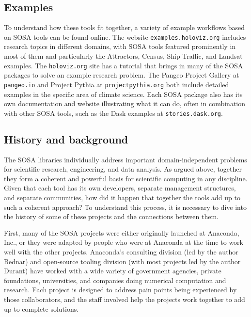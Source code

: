 \subsection{Examples}

To understand how these tools fit together, a variety of example workflows based on SOSA tools can be found online. The website \texttt{examples.holoviz.org} includes research topics in different domains, with SOSA tools featured prominently in most of them and particularly the Attractors, Census, Ship Traffic, and Landsat examples. The \texttt{holoviz.org} site has a tutorial that brings in many of the SOSA packages to solve an example research problem. The Pangeo Project Gallery at \texttt{pangeo.io} and Project Pythia at \texttt{projectpythia.org} both include detailed examples in the specific area of climate science. Each SOSA package also has its own documentation and website illustrating what it can do, often in combination with other SOSA tools, such as the Dask examples at \texttt{stories.dask.org}.

\subsection{History and background}

The SOSA libraries individually address important domain-independent problems for scientific research, engineering, and data analysis. As argued above, together they form a coherent and powerful basis for scientific computing in any discipline. Given that each tool has its own developers, separate management structures, and separate communities, how did it happen that together the tools add up to such a coherent approach? To understand this process, it is necessary to dive into the history of some of these projects and the connections between them.

First, many of the SOSA projects were either originally launched at Anaconda, Inc., or they were adapted by people who were at Anaconda at the time to work well with the other projects. Anaconda's consulting division (led by the author Bednar) and open-source tooling division (with most projects led by the author Durant) have worked with a wide variety of government agencies, private foundations, universities, and companies doing numerical computation and research. Each project is designed to address pain points being experienced by those collaborators, and the staff involved help the projects work together to add up to complete solutions.


